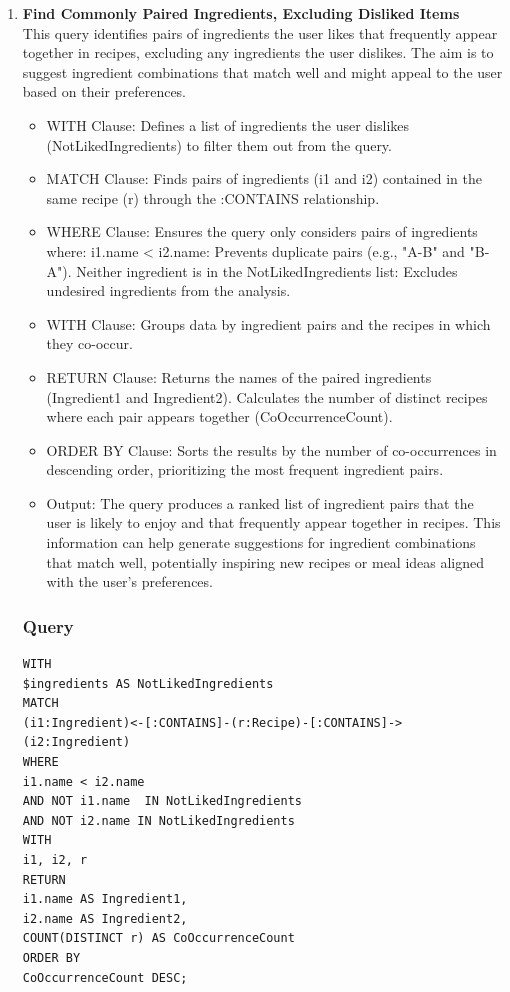 \begin{enumerate}
    \clearpage
    \item \textbf{Find Commonly Paired Ingredients, Excluding Disliked Items}\\
    This query identifies pairs of ingredients the user likes that frequently appear together in recipes, excluding any ingredients the user dislikes. The aim is to suggest ingredient combinations that match well and might appeal to the user based on their preferences.
    \begin{itemize}
        \item WITH Clause:
Defines a list of ingredients the user dislikes (NotLikedIngredients) to filter them out from the query.
        \item MATCH Clause:
Finds pairs of ingredients (i1 and i2) contained in the same recipe (r) through the :CONTAINS relationship.
        \item WHERE Clause:
Ensures the query only considers pairs of ingredients where:
i1.name < i2.name: Prevents duplicate pairs (e.g., "A-B" and "B-A").
Neither ingredient is in the NotLikedIngredients list: Excludes undesired ingredients from the analysis.
        \item WITH Clause:
Groups data by ingredient pairs and the recipes in which they co-occur.
        \item RETURN Clause:
Returns the names of the paired ingredients (Ingredient1 and Ingredient2).
Calculates the number of distinct recipes where each pair appears together (CoOccurrenceCount).
        \item ORDER BY Clause:
Sorts the results by the number of co-occurrences in descending order, prioritizing the most frequent ingredient pairs.
        \item Output:
The query produces a ranked list of ingredient pairs that the user is likely to enjoy and that frequently appear together in recipes. This information can help generate suggestions for ingredient combinations that match well, potentially inspiring new recipes or meal ideas aligned with the user's preferences.
    \end{itemize}
    \subsubsection{Query}
    \begin{verbatim}
WITH 
$ingredients AS NotLikedIngredients
MATCH
(i1:Ingredient)<-[:CONTAINS]-(r:Recipe)-[:CONTAINS]->(i2:Ingredient)
WHERE
i1.name < i2.name 
AND NOT i1.name  IN NotLikedIngredients 
AND NOT i2.name IN NotLikedIngredients
WITH
i1, i2, r
RETURN
i1.name AS Ingredient1,
i2.name AS Ingredient2,
COUNT(DISTINCT r) AS CoOccurrenceCount
ORDER BY
CoOccurrenceCount DESC;
    \end{verbatim}

\end{enumerate}
